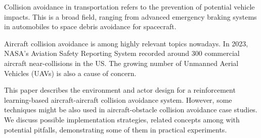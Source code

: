 
Collision avoidance in transportation refers to the prevention of potential vehicle impacts.
This is a broad field, ranging from advanced emergency braking systems in automobiles to space debris avoidance for spacecraft.

Aircraft collision avoidance is among highly relevant topics nowadays.
In 2023, NASA's Aviation Safety Reporting System recorded around 300 commercial aircraft near-collisions in the US\@.
The growing number of Unmanned Aerial Vehicles (UAVs) is also a cause of concern.

This paper describes the environment and actor design for a reinforcement learning-based aircraft-aircraft collision avoidance system.
However, some techniques might be also used in aircraft-obstacle collision avoidance case studies.
We discuss possible implementation strategies, related concepts among with potential pitfalls, demonstrating some of them in practical experiments. 
